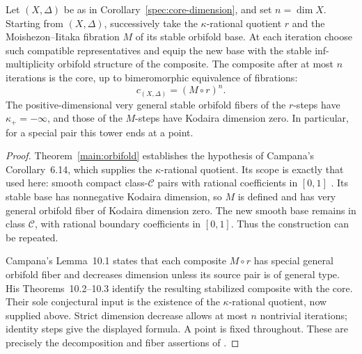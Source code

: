 \begin{corollary}
\label{spec:core-tower}
Let $(X,\Delta)$ be as in Corollary~\ref{spec:core-dimension},
and set $n=\dim X$.  Starting from $(X,\Delta)$, successively
take the $\kappa$-rational quotient $r$ and the
Moishezon--Iitaka fibration $M$ of its stable orbifold base.
At each iteration choose such compatible representatives and equip
the new base with the stable inf-multiplicity orbifold structure
of the composite.
The composite after at most $n$
iterations is the core, up to bimeromorphic equivalence of
fibrations:
\[
 c_{(X,\Delta)}=(M\circ r)^n.
\]
The positive-dimensional very general stable orbifold fibers of
the $r$-steps have $\kappa_+=-\infty$, and those of the
$M$-steps have Kodaira dimension zero.  In particular, for
a special pair this tower ends at a point.
\end{corollary}

\begin{proof}
Theorem~\ref{main:orbifold} establishes the hypothesis of
Campana's Corollary~6.14, which supplies the
$\kappa$-rational quotient.  Its scope is exactly that used
here: smooth compact class-$\mathcal C$ pairs with rational
coefficients in $[0,1]$
\cite[Conjecture~6.1 and Remark~6.2]{CampanaOrbifolds}.
Its stable base has nonnegative Kodaira dimension, so $M$
is defined and has very general orbifold fiber of Kodaira
dimension zero.  The new smooth base remains in class
$\mathcal C$, with rational boundary coefficients in $[0,1]$.
Thus the construction can be repeated.

Campana's Lemma~10.1 states that each composite $M\circ r$
has special general orbifold fiber and decreases dimension
unless its source pair is of general type.  His
Theorems~10.2--10.3 identify the resulting stabilized
composite with the core.  Their sole conjectural input is
the existence of the $\kappa$-rational quotient, now supplied
above.  Strict dimension decrease allows at most $n$
nontrivial iterations; identity steps give the displayed
formula.  A point is fixed throughout.
These are precisely the decomposition and fiber assertions of
\cite[Lemma~10.1, Theorems~10.2--10.3, and Corollary~10.4]
{CampanaOrbifolds}.
\end{proof}
